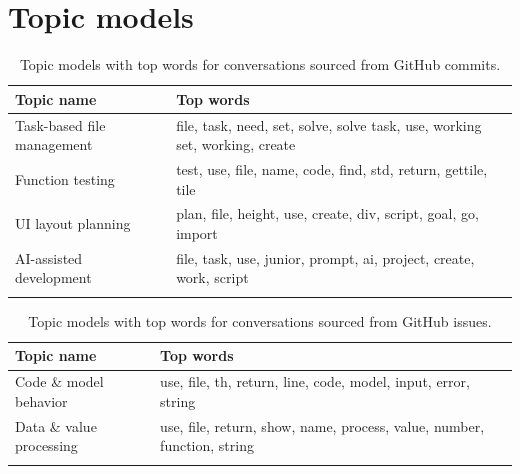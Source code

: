 \pagebreak
\section{Topic models}\label{appendix:topic-models}

\begin{longtable}{|m{3cm}|m{9cm}|}
    \hline
    \textbf{Topic name} & \textbf{Top words}  \\
    \hline
    \hline
        Task-based file management & file, task, need, set, solve, solve task, use, working set, working, create \\
    \hline
        Function testing & test, use, file, name, code, find, std, return, gettile, tile \\
    \hline
        UI layout planning & plan, file, height, use, create, div, script, goal, go, import \\
    \hline
        AI-assisted development & file, task, use, junior, prompt, ai, project, create, work, script \\
    \hline
\caption{Topic models with top words for conversations sourced from GitHub commits.}
\label{table:commits-topics}
\end{longtable}

\begin{longtable}{|m{4cm}|m{8cm}|}
    \hline
    \textbf{Topic name} & \textbf{Top words}  \\
    \hline
    \hline
        Code \& model behavior & use, file, th, return, line, code, model, input, error, string \\
    \hline
        Data \& value processing & use, file, return, show, name, process, value, number, function, string \\
    \hline
\caption{Topic models with top words for conversations sourced from GitHub issues.}
\label{table:issues-topics}
\end{longtable}

